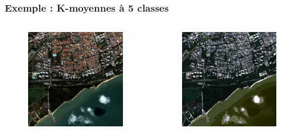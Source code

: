 \documentclass[compress,handout]{beamer}
\begin{document}
\begin{frame}
\frametitle{Exemple : K-moyennes à 5 classes }
\begin{columns}
\begin{column}{0.5\textwidth}
\begin{figure}[]
  \includegraphics[width=1.0\textwidth]{radio2-extract-3b.jpg}
\end{figure}
\end{column}
\begin{column}{0.5\textwidth}
\begin{figure}[]
  \includegraphics[width=1.0\textwidth]{kmeans-5-classes.png}
\end{figure}
\end{column}
\end{columns}
\end{frame}
\end{document}
